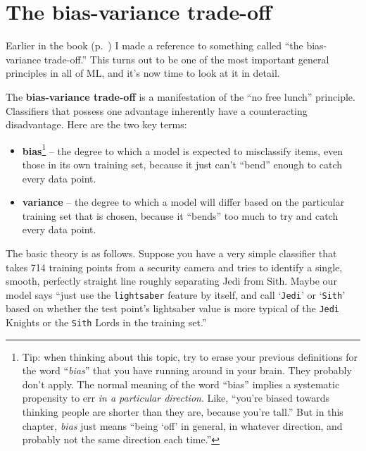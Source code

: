 
\chapter{The bias-variance trade-off}

Earlier in the book (p.~\pageref{bvTradeoffLowess}) I made a reference to
something called ``the bias-variance trade-off.'' This turns out to be one of
the most important general principles in all of ML, and it's now time to look
at it in detail.


The \textbf{bias-variance trade-off} is a manifestation of the ``no free
lunch'' principle. Classifiers that possess one advantage inherently have a
counteracting disadvantage. Here are the two key terms:

\begin{itemize}
\itemsep.1em

\item \textbf{bias}\footnote{Tip: when thinking about this topic, try to erase
your previous definitions for the word ``\textit{bias}'' that you have running
around in your brain. They probably don't apply. The normal meaning of the word
``bias'' implies a systematic propensity to err \textit{in a particular
direction}. Like, ``you're biased towards thinking people are shorter than they
are, because you're tall.'' But in this chapter, \textit{bias} just means
``being `off' in general, in whatever direction, and probably not the same
direction each time.''} -- the degree to which a model is expected to
misclassify items, even those in its own training set, because it just can't
``bend'' enough to catch every data point.

\item \textbf{variance} -- the degree to which a model will differ based on the
particular training set that is chosen, because it ``bends'' too much to try
and catch every data point.

\end{itemize}


The basic theory is as follows. Suppose you have a very simple classifier that
takes 714 training points from a security camera and tries to identify a
single, smooth, perfectly straight line roughly separating Jedi from Sith.
Maybe our model says ``just use the \texttt{lightsaber} feature by itself, and
call `\texttt{Jedi}' or `\texttt{Sith}' based on whether the test point's
lightsaber value is more typical of the \texttt{Jedi} Knights or the
\texttt{Sith} Lords in the training set.''

